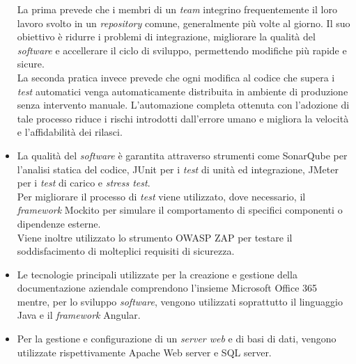 \begin{itemize}
    La prima prevede che i membri di un \emph{team} integrino frequentemente il loro lavoro svolto in un \emph{repository} comune, generalmente più volte al giorno. Il suo obiettivo è ridurre i problemi di integrazione, migliorare la qualità del \emph{software} e accellerare il ciclo di sviluppo, permettendo modifiche più rapide e sicure.\\
    La seconda pratica invece prevede che ogni modifica al codice che supera i \emph{test} automatici venga automaticamente distribuita in ambiente di produzione senza intervento manuale. L'automazione completa ottenuta con l'adozione di tale processo riduce i rischi introdotti dall'errore umano e migliora la velocità e l'affidabilità dei rilasci.
    \item La qualità del \emph{software} è garantita attraverso strumenti come SonarQube per l'analisi statica del codice, JUnit per i \emph{test} di unità ed integrazione, JMeter per i \emph{test} di carico e \emph{stress test}.\\
    Per migliorare il processo di \emph{test} viene utilizzato, dove necessario, il \emph{framework} Mockito per simulare il comportamento di specifici componenti o dipendenze esterne.\\
    Viene inoltre utilizzato lo strumento OWASP ZAP per testare il soddisfacimento di molteplici requisiti di sicurezza. 
    \item Le tecnologie principali utilizzate per la creazione e gestione della documentazione aziendale comprendono l'insieme Microsoft Office 365 mentre, per lo sviluppo \emph{software}, vengono utilizzati soprattutto il linguaggio Java e il \emph{framework} Angular. 
    \item Per la gestione e configurazione di un \emph{server web} e di basi di dati, vengono utilizzate rispettivamente Apache Web server e SQL server. 
\end{itemize}

